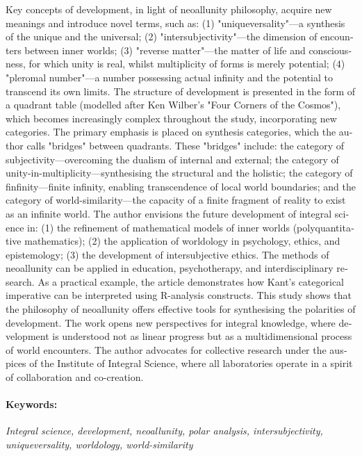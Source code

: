 \begin{english}
    Key concepts of development, in light of neoallunity philosophy, acquire new meanings and introduce novel terms, such as: (1) "uniqueversality"—a synthesis of the unique and the universal; (2) "intersubjectivity"—the dimension of encounters between inner worlds; (3) "reverse matter"—the matter of life and consciousness, for which unity is real, whilst multiplicity of forms is merely potential; (4) "pleromal number"—a number possessing actual infinity and the potential to transcend its own limits. The structure of development is presented in the form of a quadrant table (modelled after Ken Wilber's "Four Corners of the Cosmos"), which becomes increasingly complex throughout the study, incorporating new categories. The primary emphasis is placed on synthesis categories, which the author calls "bridges" between quadrants. These "bridges" include: the category of subjectivity—overcoming the dualism of internal and external; the category of unity-in-multiplicity—synthesising the structural and the holistic; the category of finfinity—finite infinity, enabling transcendence of local world boundaries; and the category of world-similarity—the capacity of a finite fragment of reality to exist as an infinite world.
    The author envisions the future development of integral science in: (1) the refinement of mathematical models of inner worlds (polyquantitative mathematics); (2) the application of worldology in psychology, ethics, and epistemology; (3) the development of intersubjective ethics. The methods of neoallunity can be applied in education, psychotherapy, and interdisciplinary research. As a practical example, the article demonstrates how Kant's categorical imperative can be interpreted using R-analysis constructs. This study shows that the philosophy of neoallunity offers effective tools for synthesising the polarities of development. The work opens new perspectives for integral knowledge, where development is understood not as linear progress but as a multidimensional process of world encounters. The author advocates for collective research under the auspices of the Institute of Integral Science, where all laboratories operate in a spirit of collaboration and co-creation.

    \paragraph{Keywords:} \textit{Integral science, development, neoallunity, polar analysis, intersubjectivity, uniqueversality, worldology, world-similarity}
    \end{english}
\else
